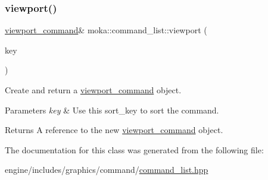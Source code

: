 \subsubsection{\texorpdfstring{viewport()}{viewport()}\hspace{0.1cm}{\footnotesize\ttfamily [2/2]}}
{\footnotesize\ttfamily \mbox{\hyperlink{classmoka_1_1viewport__command}{viewport\+\_\+command}}\& moka\+::command\+\_\+list\+::viewport (\begin{DoxyParamCaption}\item[{\mbox{\hyperlink{namespacemoka_afa30a616e67b83113ebdb857555cf2bb}{sort\+\_\+key}}}]{key }\end{DoxyParamCaption})}



Create and return a \mbox{\hyperlink{classmoka_1_1viewport__command}{viewport\+\_\+command}} object. 


\begin{DoxyParams}{Parameters}
{\em key} & Use this sort\+\_\+key to sort the command. \\
\hline
\end{DoxyParams}
\begin{DoxyReturn}{Returns}
A reference to the new \mbox{\hyperlink{classmoka_1_1viewport__command}{viewport\+\_\+command}} object. 
\end{DoxyReturn}


The documentation for this class was generated from the following file\+:\begin{DoxyCompactItemize}
\item 
engine/includes/graphics/command/\mbox{\hyperlink{command__list_8hpp}{command\+\_\+list.\+hpp}}\end{DoxyCompactItemize}
